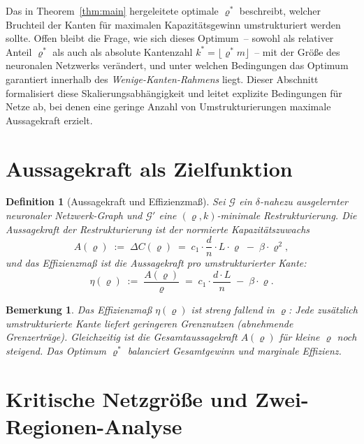 \documentclass[12pt, a4paper, openany]{report}
\newtheorem{definition}[theorem]{Definition}
\newtheorem{remark}[theorem]{Bemerkung}
\newcommand{\calG}{\mathcal{G}}
\begin{document}
Das in Theorem~\ref{thm:main} hergeleitete optimale $\varrho^*$ beschreibt,
welcher Bruchteil der Kanten für maximalen Kapazitätsgewinn umstrukturiert
werden sollte.  Offen bleibt die Frage, wie sich dieses Optimum~-- sowohl
als relativer Anteil $\varrho^*$ als auch als absolute Kantenzahl
$k^* = \lfloor\varrho^* m\rfloor$~-- mit der Größe des neuronalen Netzwerks
verändert, und unter welchen Bedingungen das Optimum garantiert innerhalb des
\emph{Wenige-Kanten-Rahmens} liegt.  Dieser Abschnitt formalisiert diese
Skalierungsabhängigkeit und leitet explizite Bedingungen für Netze ab, bei
denen eine geringe Anzahl von Umstrukturierungen maximale Aussagekraft erzielt.

\section{Aussagekraft als Zielfunktion}
\label{sec:scaling_obj}

\begin{definition}[Aussagekraft und Effizienzmaß]
\label{def:aussagekraft}
Sei $\calG$ ein $\delta$-nahezu ausgelernter neuronaler Netzwerk-Graph und
$\calG'$ eine $(\varrho, k)$-minimale Restrukturierung.  Die
\emph{Aussagekraft} der Restrukturierung ist der normierte Kapazitätszuwachs
\[
  A(\varrho) \;:=\; \Delta C(\varrho)
  \;=\; c_1 \cdot \frac{d}{n} \cdot L \cdot \varrho \;-\; \beta \cdot \varrho^2,
\]
und das \emph{Effizienzmaß} ist die Aussagekraft pro umstrukturierter Kante:
\begin{equation}
  \label{eq:efficiency}
  \eta(\varrho)
  \;:=\; \frac{A(\varrho)}{\varrho}
  \;=\; c_1 \cdot \frac{d \cdot L}{n} \;-\; \beta \cdot \varrho.
\end{equation}
\end{definition}

\begin{remark}
Das Effizienzmaß $\eta(\varrho)$ ist streng fallend in $\varrho$: Jede
zusätzlich umstrukturierte Kante liefert geringeren Grenznutzen (abnehmende
Grenzerträge).  Gleichzeitig ist die Gesamtaussagekraft $A(\varrho)$ für
kleine $\varrho$ noch steigend.  Das Optimum $\varrho^*$ balanciert
Gesamtgewinn und marginale Effizienz.
\end{remark}

\section{Kritische Netzgröße und Zwei-Regionen-Analyse}
\label{sec:scaling_crit}
\end{document}
